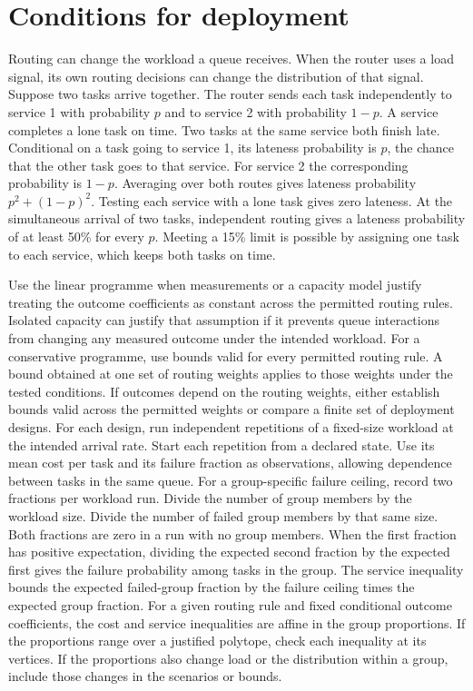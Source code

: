 \documentclass[11pt,reqno]{amsart}
\theoremstyle{definition}
\theoremstyle{remark}
\begin{document}
\section{Conditions for deployment}
\label{sec:discussion}
Routing can change the workload a queue receives. When the router uses a load signal, its own routing decisions can change the distribution of that signal.
Suppose two tasks arrive together. The router sends each task independently to service 1 with probability $p$ and to service 2 with probability $1-p$. A service completes a lone task on time. Two tasks at the same service both finish late.
Conditional on a task going to service 1, its lateness probability is $p$, the chance that the other task goes to that service. For service 2 the corresponding probability is $1-p$. Averaging over both routes gives lateness probability $p^2+(1-p)^2$.
Testing each service with a lone task gives zero lateness. At the simultaneous arrival of two tasks, independent routing gives a lateness probability of at least 50\% for every $p$. Meeting a 15\% limit is possible by assigning one task to each service, which keeps both tasks on time.

Use the linear programme when measurements or a capacity model justify treating the outcome coefficients as constant across the permitted routing rules. Isolated capacity can justify that assumption if it prevents queue interactions from changing any measured outcome under the intended workload.
For a conservative programme, use bounds valid for every permitted routing rule. A bound obtained at one set of routing weights applies to those weights under the tested conditions.
If outcomes depend on the routing weights, either establish bounds valid across the permitted weights or compare a finite set of deployment designs. For each design, run independent repetitions of a fixed-size workload at the intended arrival rate. Start each repetition from a declared state. Use its mean cost per task and its failure fraction as observations, allowing dependence between tasks in the same queue.
For a group-specific failure ceiling, record two fractions per workload run. Divide the number of group members by the workload size. Divide the number of failed group members by that same size. Both fractions are zero in a run with no group members. When the first fraction has positive expectation, dividing the expected second fraction by the expected first gives the failure probability among tasks in the group. The service inequality bounds the expected failed-group fraction by the failure ceiling times the expected group fraction.
For a given routing rule and fixed conditional outcome coefficients, the cost and service inequalities are affine in the group proportions. If the proportions range over a justified polytope, check each inequality at its vertices. If the proportions also change load or the distribution within a group, include those changes in the scenarios or bounds.
\end{document}
